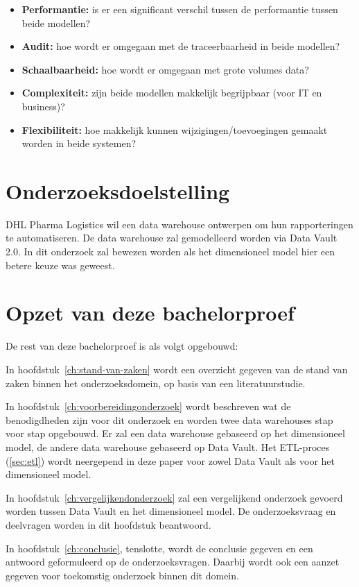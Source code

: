 \begin{itemize}
	\item \textbf{Performantie:} is er een significant verschil tussen de performantie tussen beide modellen?
	\item \textbf{Audit:} hoe wordt er omgegaan met de traceerbaarheid in beide modellen?
	\item \textbf{Schaalbaarheid:} hoe wordt er omgegaan met grote volumes data?
	\item \textbf{Complexiteit:} zijn beide modellen makkelijk begrijpbaar (voor IT en business)?
	\item \textbf{Flexibiliteit:} hoe makkelijk kunnen wijzigingen/toevoegingen gemaakt worden in beide systemen?
	
\end{itemize}

\section{Onderzoeksdoelstelling}
\label{sec:onderzoeksdoelstelling}
DHL Pharma Logistics wil een data warehouse ontwerpen om hun rapporteringen te automatiseren. De data warehouse zal gemodelleerd worden via Data Vault 2.0. In dit onderzoek zal bewezen worden als het dimensioneel model hier een betere keuze was geweest.

\section{Opzet van deze bachelorproef}
\label{sec:opzet-bachelorproef}


De rest van deze bachelorproef is als volgt opgebouwd:

In hoofdstuk~\ref{ch:stand-van-zaken} wordt een overzicht gegeven van de stand van zaken binnen het onderzoeksdomein, op basis van een literatuurstudie.

In hoofdstuk~\ref{ch:voorbereidingonderzoek} wordt beschreven wat de benodigdheden zijn voor dit onderzoek en worden twee data warehouses stap voor stap opgebouwd. Er zal een data warehouse gebaseerd op het dimensioneel model, de andere data warehouse gebaseerd op Data Vault. Het ETL-proces (\ref{sec:etl}) wordt neergepend in deze paper voor zowel Data Vault als voor het dimensioneel model.

In hoofdstuk~\ref{ch:vergelijkendonderzoek} zal een vergelijkend onderzoek gevoerd worden tussen Data Vault en het dimensioneel model. De onderzoeksvraag en deelvragen worden in dit hoofdstuk beantwoord.

In hoofdstuk~\ref{ch:conclusie}, tenslotte, wordt de conclusie gegeven en een antwoord geformuleerd op de onderzoeksvragen. Daarbij wordt ook een aanzet gegeven voor toekomstig onderzoek binnen dit domein.

